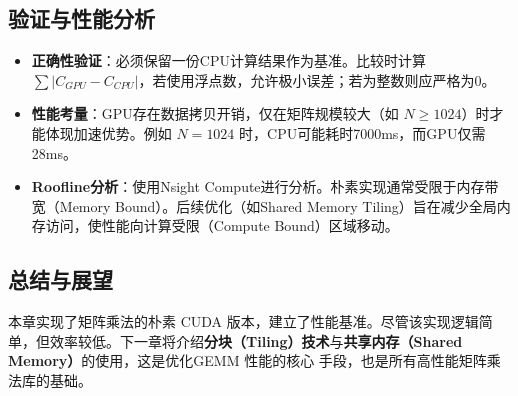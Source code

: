 \subsection{验证与性能分析}
\begin{itemize}
    \item \textbf{正确性验证}：必须保留一份CPU计算结果作为基准。比较时计算 $\sum |C_{GPU} - C_{CPU}|$，若使用浮点数，允许极小误差；若为整数则应严格为0。
    \item \textbf{性能考量}：GPU存在数据拷贝开销，仅在矩阵规模较大（如 $N \geq 1024$）时才能体现加速优势。例如 $N=1024$ 时，CPU可能耗时7000ms，而GPU仅需28ms。
    \item \textbf{Roofline分析}：使用Nsight Compute进行分析。朴素实现通常受限于内存带宽（Memory Bound）。后续优化（如Shared Memory Tiling）旨在减少全局内存访问，使性能向计算受限（Compute Bound）区域移动。
\end{itemize}

\subsection{总结与展望}

本章实现了矩阵乘法的朴素 CUDA 版本，建立了性能基准。尽管该实现逻辑简单，但效率较低。下一章将介绍\textbf
{分块（Tiling）技术}与\textbf{共享内存（Shared Memory）}的使用，这是优化GEMM 性能的核心
手段，也是所有高性能矩阵乘法库的基础。


